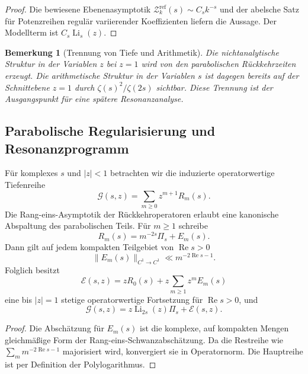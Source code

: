 \documentclass[11pt,a4paper]{article}
\newtheorem{remark}{Bemerkung}[section]
\begin{document}
\begin{proof}
Die bewiesene Ebenenasymptotik
$\mathcal Z_k^{\mathrm{ref}}(s)\sim C_sk^{-s}$ und der
abelsche Satz für Potenzreihen regulär variierender Koeffizienten liefern
die Aussage. Der Modellterm ist $C_s\operatorname{Li}_s(z)$.
\end{proof}

\begin{remark}[Trennung von Tiefe und Arithmetik]
Die nichtanalytische Struktur in der Variablen $z$ bei $z=1$ wird von den
parabolischen Rückkehrzeiten erzeugt. Die arithmetische Struktur in der
Variablen $s$ ist dagegen bereits auf der Schnittebene $z=1$ durch
$\zeta(s)^2/\zeta(2s)$ sichtbar. Diese Trennung ist der Ausgangspunkt
für eine spätere Resonanzanalyse.
\end{remark}

\subsection{Parabolische Regularisierung und Resonanzprogramm}

Für komplexes $s$ und $|z|<1$ betrachten wir die induzierte
operatorwertige Tiefenreihe
\[
 \mathcal G(s,z)
 =\sum_{m\ge0}z^{m+1}R_m(s).
\]
Die Rang-eins-Asymptotik der Rückkehroperatoren erlaubt eine kanonische
Abspaltung des parabolischen Teils. Für $m\ge1$ schreibe
\[
 R_m(s)=m^{-2s}\Pi_s+E_m(s).
\]
Dann gilt auf jedem kompakten Teilgebiet von $\operatorname{Re}s>0$
\[
 \|E_m(s)\|_{C^1\to C^1}
 \ll m^{-2\operatorname{Re}s-1}.
\]
Folglich besitzt
\[
 \mathcal E(s,z)
 =
 zR_0(s)+z\sum_{m\ge1}z^mE_m(s)
\]
eine bis $|z|=1$ stetige operatorwertige Fortsetzung für
$\operatorname{Re}s>0$, und
\begin{equation}\label{eq:polylog-regularization}
 \mathcal G(s,z)
 =
 z\operatorname{Li}_{2s}(z)\Pi_s+\mathcal E(s,z).
\end{equation}

\begin{proof}
Die Abschätzung für $E_m(s)$ ist die komplexe, auf kompakten Mengen
gleichmäßige Form der Rang-eins-Schwanzabschätzung. Da die Restreihe wie
$\sum_mm^{-2\operatorname{Re}s-1}$ majorisiert wird, konvergiert sie
in Operatornorm. Die Hauptreihe ist per Definition der Polylogarithmus.
\end{proof}
\end{document}

